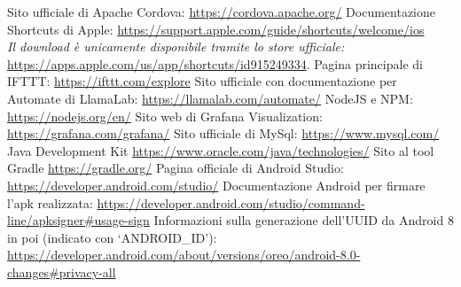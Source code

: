 \documentclass[target=bach]{thud}
\begin{document}
\begin{thebibliography}{9}
    Sito ufficiale di Apache Cordova: \url{https://cordova.apache.org/}
    Documentazione Shortcuts di Apple: \url{https://support.apple.com/guide/shortcuts/welcome/ios}\\
    \textit{Il download è unicamente disponibile tramite lo store ufficiale:} \url{https://apps.apple.com/us/app/shortcuts/id915249334}.
    Pagina principale di IFTTT: \url{https://ifttt.com/explore}
    Sito ufficiale con documentazione per Automate di LlamaLab: \url{https://llamalab.com/automate/}
    NodeJS e NPM: \url{https://nodejs.org/en/}
    Sito web di Grafana Visualization: \url{https://grafana.com/grafana/}
    Sito ufficiale di MySql: \url{https://www.mysql.com/}
    Java Development Kit \url{https://www.oracle.com/java/technologies/}
    Sito al tool Gradle \url{https://gradle.org/}
    Pagina officiale di Android Studio: \url{https://developer.android.com/studio/}
    Documentazione Android per firmare l'apk realizzata: \url{https://developer.android.com/studio/command-line/apksigner#usage-sign}
    Informazioni sulla generazione dell'UUID da Android 8 in poi (indicato con `ANDROID\_ID'): \url{https://developer.android.com/about/versions/oreo/android-8.0-changes#privacy-all}

\end{thebibliography}


\end{document}
